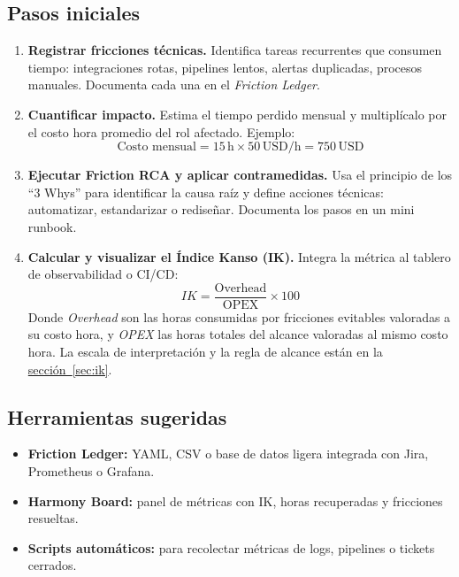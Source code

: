 \subsection*{Pasos iniciales}
\begin{enumerate}
    \item \textbf{Registrar fricciones técnicas.}  
    Identifica tareas recurrentes que consumen tiempo: integraciones rotas, pipelines lentos, alertas duplicadas, procesos manuales.  
    Documenta cada una en el \textit{Friction Ledger}.

    \item \textbf{Cuantificar impacto.}  
    Estima el tiempo perdido mensual y multiplícalo por el costo hora promedio del rol afectado.  
    Ejemplo:
    \[
    \text{Costo mensual} = 15\,\text{h} \times 50\,\text{USD/h} = 750\,\text{USD}
    \]

    \item \textbf{Ejecutar Friction RCA y aplicar contramedidas.}  
    Usa el principio de los ``3 Whys'' para identificar la causa raíz y define acciones técnicas: automatizar, estandarizar o rediseñar.  
    Documenta los pasos en un mini runbook.

    \item \textbf{Calcular y visualizar el Índice Kanso (IK).}  
    Integra la métrica al tablero de observabilidad o CI/CD:
    \[
    IK = \frac{\text{Overhead}}{\text{OPEX}} \times 100
    \]  
    Donde \textit{Overhead} son las horas consumidas por fricciones evitables valoradas a su costo
    hora, y \textit{OPEX} las horas totales del alcance valoradas al mismo costo hora. La escala de
    interpretación y la regla de alcance están en la \hyperref[sec:ik]{sección~\ref{sec:ik}}.
\end{enumerate}

\subsection*{Herramientas sugeridas}
\begin{itemize}
    \item \textbf{Friction Ledger:} YAML, CSV o base de datos ligera integrada con Jira, Prometheus o Grafana.
    \item \textbf{Harmony Board:} panel de métricas con IK, horas recuperadas y fricciones resueltas.
    \item \textbf{Scripts automáticos:} para recolectar métricas de logs, pipelines o tickets cerrados.
\end{itemize}

